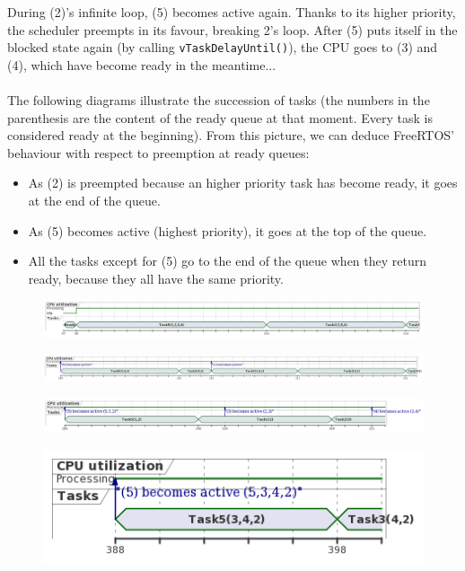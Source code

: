 \documentclass[10pt]{article}
\begin{document}
During (2)'s infinite loop, (5) becomes active again. Thanks to its higher priority, the scheduler preempts in its favour, breaking 2's loop. After (5) puts itself in the blocked state again (by calling \verb|vTaskDelayUntil()|), the CPU goes to (3) and (4), which have become ready in the meantime...
\\
\\
The following diagrams illustrate the succession of tasks (the numbers in the parenthesis are the content of the ready queue at that moment. Every task is considered ready at the beginning). From this picture, we can deduce FreeRTOS' behaviour with respect to preemption at ready queues:
\begin{itemize}
\item As (2) is preempted because an higher priority task has become ready, it goes at the end of the queue.
\item As (5) becomes active (highest priority), it goes at the top of the queue.
\item All the tasks except for (5) go to the end of the queue when they return ready, because they all have the same priority.
\end{itemize}


\begin{figure}[H]
    \centering
    \includegraphics[width=1.0\linewidth]{Pictures/gantt2_1.png}
    \caption{}
    \label{fig:6}
\end{figure}
\begin{figure}[H]
    \centering
    \includegraphics[width=1.0\linewidth]{Pictures/gantt2_2.png}
    \caption{}
    \label{fig:7}
\end{figure}
\begin{figure}[H]
    \centering
    \includegraphics[width=1.0\linewidth]{Pictures/gantt2_3.png}
    \caption{}
    \label{fig:8}
\end{figure}
\begin{figure}[H]
    \centering
    \includegraphics[width=0.3\linewidth]{Pictures/gantt2_4.png}
    \caption{}
    \label{fig:9}
\end{figure}
\end{document}
